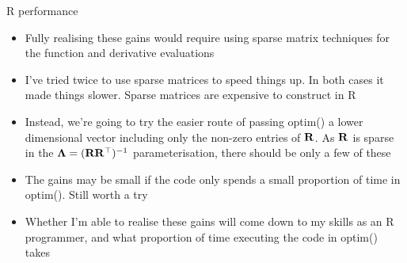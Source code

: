 \documentclass{beamer}
\begin{document}
\begin{frame}{R performance}
\begin{itemize}
\item Fully realising these gains would require using sparse matrix techniques for the function and
			derivative evaluations
\item I've tried twice to use sparse matrices to speed things up. In both cases it made things slower.
			Sparse matrices are expensive to construct in R
\item Instead, we're going to try the easier route of passing optim() a lower dimensional vector
			including only the non-zero entries of ${\bf R}$. As ${\bf R}$ is sparse in the
			${\boldsymbol \Lambda} = ({\bf R} {\bf R}^\top)^{-1}$ parameterisation, there should be only a few of these
\item The gains may be small if the code only spends a small proportion of time in optim(). Still
			worth a try
\item Whether I'm able to realise these gains will come down to my skills as an R programmer, and
			what proportion of time executing the code in optim() takes
\end{itemize}
\end{frame}
\end{document}
